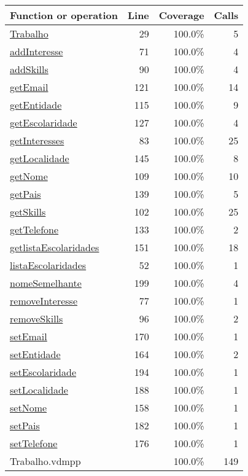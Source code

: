 \begin{longtable}{|l|r|r|r|}
\hline
Function or operation & Line & Coverage & Calls \\
\hline
\hline
\hyperref[Trabalho:29]{Trabalho} & 29&100.0\% & 5 \\
\hline
\hyperref[addInteresse:71]{addInteresse} & 71&100.0\% & 4 \\
\hline
\hyperref[addSkills:90]{addSkills} & 90&100.0\% & 4 \\
\hline
\hyperref[getEmail:121]{getEmail} & 121&100.0\% & 14 \\
\hline
\hyperref[getEntidade:115]{getEntidade} & 115&100.0\% & 9 \\
\hline
\hyperref[getEscolaridade:127]{getEscolaridade} & 127&100.0\% & 4 \\
\hline
\hyperref[getInteresses:83]{getInteresses} & 83&100.0\% & 25 \\
\hline
\hyperref[getLocalidade:145]{getLocalidade} & 145&100.0\% & 8 \\
\hline
\hyperref[getNome:109]{getNome} & 109&100.0\% & 10 \\
\hline
\hyperref[getPais:139]{getPais} & 139&100.0\% & 5 \\
\hline
\hyperref[getSkills:102]{getSkills} & 102&100.0\% & 25 \\
\hline
\hyperref[getTelefone:133]{getTelefone} & 133&100.0\% & 2 \\
\hline
\hyperref[getlistaEscolaridades:151]{getlistaEscolaridades} & 151&100.0\% & 18 \\
\hline
\hyperref[listaEscolaridades:52]{listaEscolaridades} & 52&100.0\% & 1 \\
\hline
\hyperref[nomeSemelhante:199]{nomeSemelhante} & 199&100.0\% & 4 \\
\hline
\hyperref[removeInteresse:77]{removeInteresse} & 77&100.0\% & 1 \\
\hline
\hyperref[removeSkills:96]{removeSkills} & 96&100.0\% & 2 \\
\hline
\hyperref[setEmail:170]{setEmail} & 170&100.0\% & 1 \\
\hline
\hyperref[setEntidade:164]{setEntidade} & 164&100.0\% & 2 \\
\hline
\hyperref[setEscolaridade:194]{setEscolaridade} & 194&100.0\% & 1 \\
\hline
\hyperref[setLocalidade:188]{setLocalidade} & 188&100.0\% & 1 \\
\hline
\hyperref[setNome:158]{setNome} & 158&100.0\% & 1 \\
\hline
\hyperref[setPais:182]{setPais} & 182&100.0\% & 1 \\
\hline
\hyperref[setTelefone:176]{setTelefone} & 176&100.0\% & 1 \\
\hline
\hline
Trabalho.vdmpp & & 100.0\% & 149 \\
\hline
\end{longtable}

